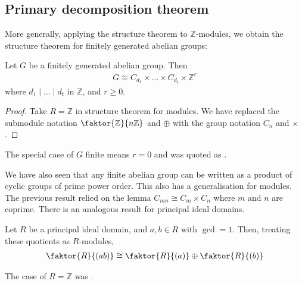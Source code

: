 \subsection{Primary decomposition theorem}
More generally, applying the structure theorem to $\mathbb Z$-modules, we obtain the structure theorem for finitely generated abelian groups:
\begin{theorem}
	Let $G$ be a finitely generated abelian group.
	Then
	\begin{align*}
		G \cong C_{d_1} \times \dots \times C_{d_t} \times \mathbb Z^r
	\end{align*}
	where $d_1 \mid \dots \mid d_t$ in $\mathbb Z$, and $r \geq 0$.
\end{theorem}

\begin{proof}
	Take $R = \mathbb{Z}$ in structure theorem for modules. 
	We have replaced the submodule notation $\faktor{\mathbb Z}{n\mathbb Z}$ and $\oplus$ with the group notation $C_n$ and $\times$.
\end{proof} 

\begin{remark}
	The special case of $G$ finite means $r = 0$ and was quoted as .
\end{remark} 

We have also seen that any finite abelian group can be written as a product of cyclic groups of prime power order.
This also has a generalisation for modules.
The previous result relied on the lemma $C_{mn} \cong C_m \times C_n$ where $m$ and $n$ are coprime.
There is an analogous result for principal ideal domains.

\begin{lemma} \label{lem:16.6}
	Let $R$ be a principal ideal domain, and $a, b \in R$ with $\operatorname{gcd} = 1$.
	Then, treating these quotients as $R$-modules,
	\begin{align*}
		\faktor{R}{(ab)} \cong \faktor{R}{(a)} \oplus \faktor{R}{(b)}
	\end{align*}
\end{lemma}

\begin{note}
	The case of $R = \mathbb{Z}$ was .
\end{note} 

